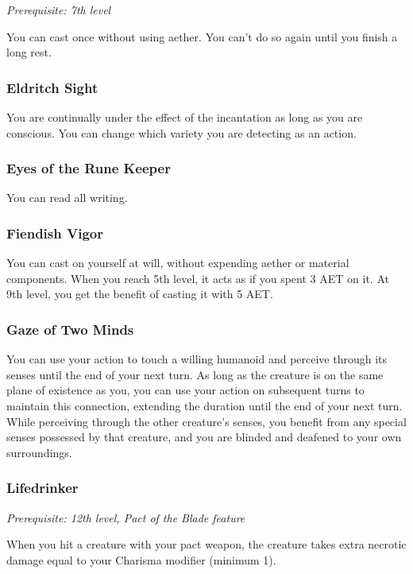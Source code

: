 \textit{Prerequisite: 7th level}

You can cast  once without using aether. You can't do so again until you finish a long rest.

\subsubsection{Eldritch Sight}

You are continually under the effect of the  incantation as long as you are conscious. You can change which variety you are detecting as an action.

\subsubsection{Eyes of the Rune Keeper}

You can read all writing.

\subsubsection{Fiendish Vigor}

You can cast  on yourself at will, without expending aether or material components. When you reach 5th level, it acts as if you spent 3 AET on it. At 9th level, you get the benefit of casting it with 5 AET.

\subsubsection{Gaze of Two Minds}

You can use your action to touch a willing humanoid and perceive through its senses until the end of your next turn. As long as the creature is on the same plane of existence as you, you can use your action on subsequent turns to maintain this connection, extending the duration until the end of your next turn. While perceiving through the other creature's senses, you benefit from any special senses possessed by that creature, and you are blinded and deafened to your own surroundings.

\subsubsection{Lifedrinker}

\textit{Prerequisite: 12th level, Pact of the Blade feature}

When you hit a creature with your pact weapon, the creature takes extra necrotic damage equal to your Charisma modifier (minimum 1).

